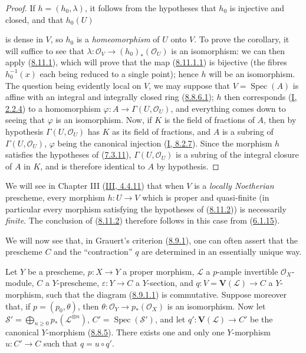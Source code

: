 \begin{proof}
If $h=(h_0,\lambda)$, it follows from the hypotheses that $h_0$ is injective
and closed, and that $h_0(U)$

is dense in $V$, so $h_0$ is a \emph{homeomorphism} of $U$ onto $V$.
To prove the corollary, it will suffice to see that
$\lambda:\mathcal{O}_V\to(h_0)_*(\mathcal{O}_U)$ is an isomorphism: we
can then apply (\hyperref[II.8.11.1]{8.11.1}), which will prove that
the map (\hyperref[II.8.11.1.1]{8.11.1.1}) is bijective (the fibres
$h_0^{-1}(x)$ each being reduced to a single point); hence $h$ will be an
isomorphism. The question being evidently local on $V$, we may suppose
that $V=\operatorname{Spec}(A)$ is affine with an integral and integrally
closed ring (\hyperref[II.8.8.6.1]{8.8.6.1}); $h$ then corresponds
(\hyperref[I.2.2.4]{I, 2.2.4}) to a homomorphism
$\varphi:A\to\Gamma(U,\mathcal{O}_U)$, and everything comes down to seeing
that $\varphi$ is an isomorphism. Now, if $K$ is the field of fractions of
$A$, then by hypothesis $\Gamma(U,\mathcal{O}_U)$ has $K$ as its field of
fractions, and $A$ is a subring of $\Gamma(U,\mathcal{O}_U)$, $\varphi$ being
the canonical injection (\hyperref[I.8.2.7]{I, 8.2.7}). Since the morphism
$h$ satisfies the hypotheses of (\hyperref[II.7.3.11]{7.3.11}),
$\Gamma(U,\mathcal{O}_U)$ is a subring of the integral closure of $A$
in $K$, and is therefore identical to $A$ by hypothesis.
\end{proof}

\begin{remark}[8.11.3]
\label{II.8.11.3}
We will see in Chapter III (\hyperref[III.4.4.11]{III, 4.4.11}) that when
$V$ is a \emph{locally Noetherian} prescheme, every morphism $h:U\to V$
which is proper and quasi-finite (in particular every morphism satisfying the
hypotheses of (\hyperref[II.8.11.2]{8.11.2})) is necessarily
\emph{finite}. The conclusion of (\hyperref[II.8.11.2]{8.11.2}) therefore
follows in this case from (\hyperref[II.6.1.15]{6.1.15}).
\end{remark}

\begin{env}[8.11.4]
\label{II.8.11.4}
We will now see that, in Grauert's criterion
(\hyperref[II.8.9.1]{8.9.1}), one can often assert that the prescheme
$C$ and the ``contraction'' $q$ are determined in an essentially
unique way.
\end{env}

\begin{lemma}[8.11.5]
\label{II.8.11.5}
Let $Y$ be a prescheme, $p:X\to Y$ a proper morphism, $\mathcal{L}$ a
$p$-ample invertible $\mathcal{O}_X$-module, $C$ a $Y$-prescheme,
$\varepsilon:Y\to C$ a $Y$-section, and
$q:V=\mathbf{V}(\mathcal{L})\to C$ a $Y$-morphism, such that the diagram
(\hyperref[II.8.9.1.1]{8.9.1.1}) is commutative. Suppose moreover that,
if $p=(p_0,\theta)$, then
$\theta:\mathcal{O}_Y\to p_*(\mathcal{O}_X)$ is an isomorphism. Now let
$\mathcal{S}'=\bigoplus_{n\geqslant0}p_*(\mathcal{L}^{\otimes n})$,
$C'=\operatorname{Spec}(\mathcal{S}')$, and let
$q':\mathbf{V}(\mathcal{L})\to C'$ be the canonical $Y$-morphism
(\hyperref[II.8.8.5]{8.8.5}). There exists one and only one $Y$-morphism
$u:C'\to C$ such that $q=u\circ q'$.
\end{lemma}

